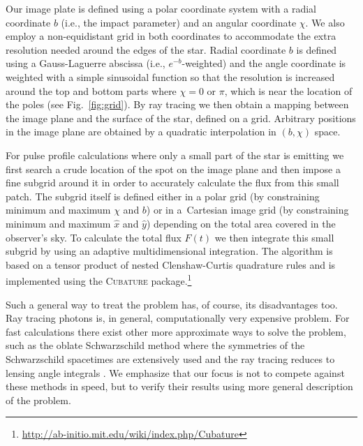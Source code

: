 \documentclass{aa}
\newcommand{\refe}[1]{#1}
\newcommand{\sch}{Schwarzschild }
\begin{document}
Our image plate is defined using a polar coordinate system with a radial
coordinate $b$ (i.e., the impact parameter) and an angular coordinate $\chi$.
We also employ a non-equidistant grid in both coordinates to accommodate
the extra resolution needed around the edges of the star.  Radial
coordinate $b$ is defined using a Gauss-Laguerre abscissa (i.e.,
$e^{-b}$-weighted) and the angle coordinate is weighted with a simple
sinusoidal function so that the resolution is increased around the top
and bottom parts where $\chi = 0$ or $\pi$, which is near the location of the poles
(see Fig.~\ref{fig:grid}).  By ray tracing we then obtain
a mapping between the image plane and the surface of the star, defined
on a grid.
Arbitrary positions in the image plane are obtained by a quadratic interpolation in $(b, \chi)$ space.

For pulse profile calculations where only a small part of the star is
emitting we first search a crude location of the spot on the image plane
and then impose a fine subgrid around it in order to accurately
calculate the flux from this small patch.  The subgrid itself is defined
either in \refe{a} polar grid (by constraining minimum and maximum $\chi$ and
$b$) or in \refe{a} Cartesian image grid (by constraining minimum and maximum
$\hat{x}$ and $\hat{y}$) depending on the total area covered in the observer's sky.  To
calculate the total flux $F(t)$ we then integrate this small subgrid by
using an adaptive multidimensional integration.  
The algorithm is based on a tensor product of nested Clenshaw-Curtis quadrature rules and is implemented using the \textsc{Cubature} package.\footnote{
\url{http://ab-initio.mit.edu/wiki/index.php/Cubature}}

\refe{
Such a general way to treat the problem has, of course, its disadvantages too.
Ray tracing photons is, in general, computationally very expensive problem.
For fast calculations there exist other more approximate ways to solve the problem, such as the oblate \sch method where the symmetries of the \sch spacetimes are extensively used and the ray tracing reduces to lensing angle integrals \citep[see e.g.][]{PB06, MLCB07}.
We emphasize that our focus is not to compete against these methods in speed, but to verify their results using more general description of the problem.
}
\end{document}

